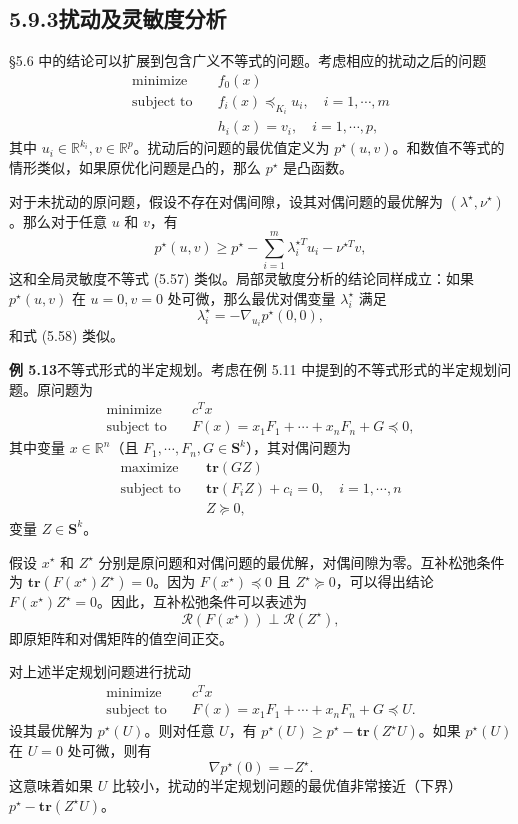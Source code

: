 \documentclass[UTF8,12pt,a4paper,fontset=fandol]{ctexart}
\begin{document}
\subsection*{5.9.3\quad 扰动及灵敏度分析}

§5.6 中的结论可以扩展到包含广义不等式的问题。考虑相应的扰动之后的问题
\[
\begin{aligned}
\text{minimize}\quad & f_0(x)\\
\text{subject to}\quad & f_i(x)\preceq_{K_i}u_i,\quad i=1,\cdots,m\\
& h_i(x)=v_i,\quad i=1,\cdots,p,
\end{aligned}
\]
其中 $u_i\in\mathbb{R}^{k_i},v\in\mathbb{R}^p$。扰动后的问题的最优值定义为 $p^\star(u,v)$。和数值不等式的情形类似，如果原优化问题是凸的，那么 $p^\star$ 是凸函数。

对于未扰动的原问题，假设不存在对偶间隙，设其对偶问题的最优解为 $(\lambda^\star,\nu^\star)$。那么对于任意 $u$ 和 $v$，有
\[
p^\star(u,v)\geq p^\star-\sum_{i=1}^m\lambda_i^{\star T}u_i-\nu^{\star T}v,
\]
这和全局灵敏度不等式 (5.57) 类似。局部灵敏度分析的结论同样成立：如果 $p^\star(u,v)$ 在 $u=0,v=0$ 处可微，那么最优对偶变量 $\lambda_i^\star$ 满足
\[
\lambda_i^\star=-\nabla_{u_i}p^\star(0,0),
\]
和式 (5.58) 类似。

\noindent\textbf{例 5.13}\quad 不等式形式的半定规划。考虑在例 5.11 中提到的不等式形式的半定规划问题。原问题为
\[
\begin{aligned}
\text{minimize}\quad & c^Tx\\
\text{subject to}\quad & F(x)=x_1F_1+\cdots+x_nF_n+G\preceq 0,
\end{aligned}
\]
其中变量 $x\in\mathbb{R}^n$（且 $F_1,\cdots,F_n,G\in\mathbf{S}^k$），其对偶问题为
\[
\begin{aligned}
\text{maximize}\quad & \mathbf{tr}(GZ)\\
\text{subject to}\quad & \mathbf{tr}(F_iZ)+c_i=0,\quad i=1,\cdots,n\\
& Z\succeq 0,
\end{aligned}
\]
变量 $Z\in\mathbf{S}^k$。

假设 $x^\star$ 和 $Z^\star$ 分别是原问题和对偶问题的最优解，对偶间隙为零。互补松弛条件为 $\mathbf{tr}(F(x^\star)Z^\star)=0$。因为 $F(x^\star)\preceq 0$ 且 $Z^\star\succeq 0$，可以得出结论 $F(x^\star)Z^\star=0$。因此，互补松弛条件可以表述为
\[
\mathcal{R}(F(x^\star))\perp\mathcal{R}(Z^\star),
\]
即原矩阵和对偶矩阵的值空间正交。

对上述半定规划问题进行扰动
\[
\begin{aligned}
\text{minimize}\quad & c^Tx\\
\text{subject to}\quad & F(x)=x_1F_1+\cdots+x_nF_n+G\preceq U.
\end{aligned}
\]
设其最优解为 $p^\star(U)$。则对任意 $U$，有 $p^\star(U)\geq p^\star-\mathbf{tr}(Z^\star U)$。如果 $p^\star(U)$ 在 $U=0$ 处可微，则有
\[
\nabla p^\star(0)=-Z^\star.
\]
这意味着如果 $U$ 比较小，扰动的半定规划问题的最优值非常接近（下界）$p^\star-\mathbf{tr}(Z^\star U)$。
\end{document}
